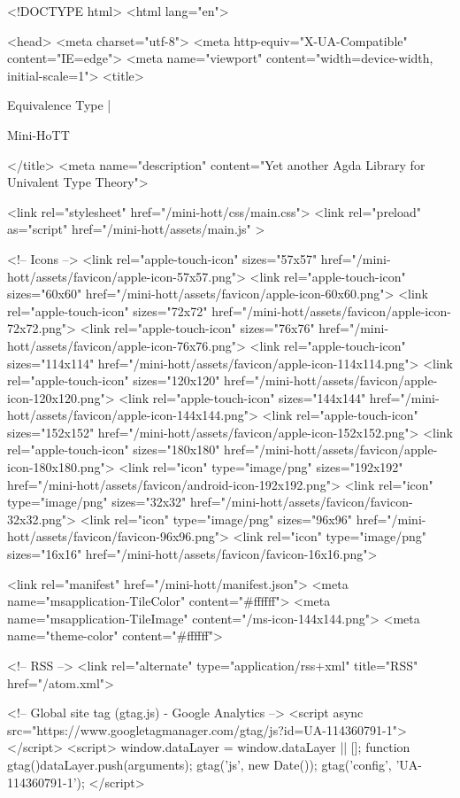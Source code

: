 <!DOCTYPE html>
<html lang="en">

<head>
  <meta charset="utf-8">
  <meta http-equiv="X-UA-Compatible" content="IE=edge">
  <meta name="viewport" content="width=device-width, initial-scale=1">
  <title>
    
      
        Equivalence Type |
      
        Mini-HoTT
    
  </title>
  <meta name="description" content="Yet another Agda Library for Univalent Type Theory">

  <link rel="stylesheet" href="/mini-hott/css/main.css">
  <link rel="preload" as="script" href="/mini-hott/assets/main.js" >

  <!-- Icons -->
  <link rel="apple-touch-icon" sizes="57x57" href="/mini-hott/assets/favicon/apple-icon-57x57.png">
  <link rel="apple-touch-icon" sizes="60x60" href="/mini-hott/assets/favicon/apple-icon-60x60.png">
  <link rel="apple-touch-icon" sizes="72x72" href="/mini-hott/assets/favicon/apple-icon-72x72.png">
  <link rel="apple-touch-icon" sizes="76x76" href="/mini-hott/assets/favicon/apple-icon-76x76.png">
  <link rel="apple-touch-icon" sizes="114x114" href="/mini-hott/assets/favicon/apple-icon-114x114.png">
  <link rel="apple-touch-icon" sizes="120x120" href="/mini-hott/assets/favicon/apple-icon-120x120.png">
  <link rel="apple-touch-icon" sizes="144x144" href="/mini-hott/assets/favicon/apple-icon-144x144.png">
  <link rel="apple-touch-icon" sizes="152x152" href="/mini-hott/assets/favicon/apple-icon-152x152.png">
  <link rel="apple-touch-icon" sizes="180x180" href="/mini-hott/assets/favicon/apple-icon-180x180.png">
  <link rel="icon" type="image/png" sizes="192x192"  href="/mini-hott/assets/favicon/android-icon-192x192.png">
  <link rel="icon" type="image/png" sizes="32x32" href="/mini-hott/assets/favicon/favicon-32x32.png">
  <link rel="icon" type="image/png" sizes="96x96" href="/mini-hott/assets/favicon/favicon-96x96.png">
  <link rel="icon" type="image/png" sizes="16x16" href="/mini-hott/assets/favicon/favicon-16x16.png">

  <link rel="manifest" href="/mini-hott/manifest.json">
  <meta name="msapplication-TileColor" content="#ffffff">
  <meta name="msapplication-TileImage" content="/ms-icon-144x144.png">
  <meta name="theme-color" content="#ffffff">

  <!-- RSS -->
  <link rel="alternate" type="application/rss+xml" title="RSS" href="/atom.xml">

  <!-- Global site tag (gtag.js) - Google Analytics -->
  <script async src="https://www.googletagmanager.com/gtag/js?id=UA-114360791-1"></script>
  <script>
    window.dataLayer = window.dataLayer || [];
    function gtag(){dataLayer.push(arguments);}
    gtag('js', new Date());
    gtag('config', 'UA-114360791-1');
  </script>

